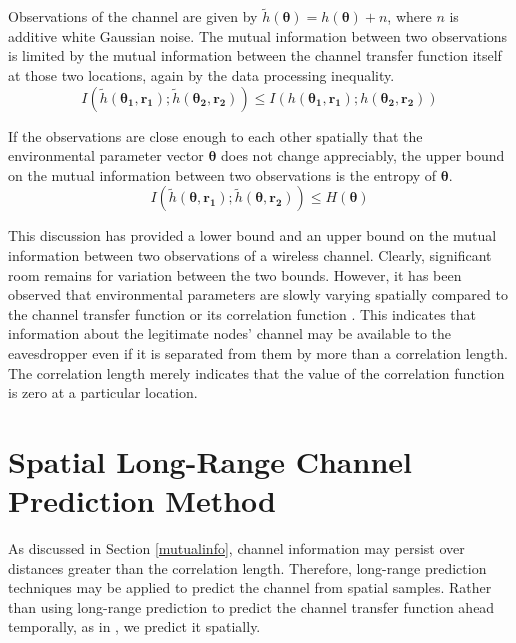 \documentclass{allertonproc}
\begin{document}
Observations of the channel are given by $\tilde{h}(\boldsymbol{\theta})=h(\boldsymbol{\theta})+n$, where $n$ is additive white Gaussian noise.  The mutual information between two observations is limited by the mutual information between the channel transfer function itself at those two locations, again by the data processing inequality.
\begin{equation}
I(\tilde{h}(\boldsymbol{\theta_1},\mathbf{r_1}); \tilde{h}(\boldsymbol{\theta_2},\mathbf{r_2}))\leq I(h(\boldsymbol{\theta_1},\mathbf{r_1}); h(\boldsymbol{\theta_2},\mathbf{r_2}))
\end{equation}

If the observations are close enough to each other spatially that the environmental parameter vector $\boldsymbol{\theta}$ does not change appreciably, the upper bound on the mutual information between two observations is the entropy of $\boldsymbol{\theta}$.
\begin{equation}
I(\tilde{h}(\boldsymbol{\theta},\mathbf{r_1}); \tilde{h}(\boldsymbol{\theta},\mathbf{r_2}))\leq H(\boldsymbol{\theta})
\end{equation}

This discussion has provided a lower bound and an upper bound on the mutual information between two observations of a wireless channel.  Clearly, significant room remains for variation between the two bounds.  However, it has been observed that environmental parameters are slowly varying spatially compared to the channel transfer function or its correlation function \cite{jakes1974, duel-hallen2007}.  This indicates that information about the legitimate nodes' channel may be available to the eavesdropper even if it is separated from them by more than a correlation length.   The correlation length merely indicates that the value of the correlation function is zero at a particular location.  

\section{Spatial Long-Range Channel Prediction Method}\label{prediction}
As discussed in Section \ref{mutualinfo}, channel information may persist over distances greater than the correlation length. Therefore, long-range prediction techniques may be applied to predict the channel from spatial samples. Rather than using long-range prediction to predict the channel transfer function ahead temporally, as in \cite{duel-hallen2007}, we predict it spatially.
\end{document}

